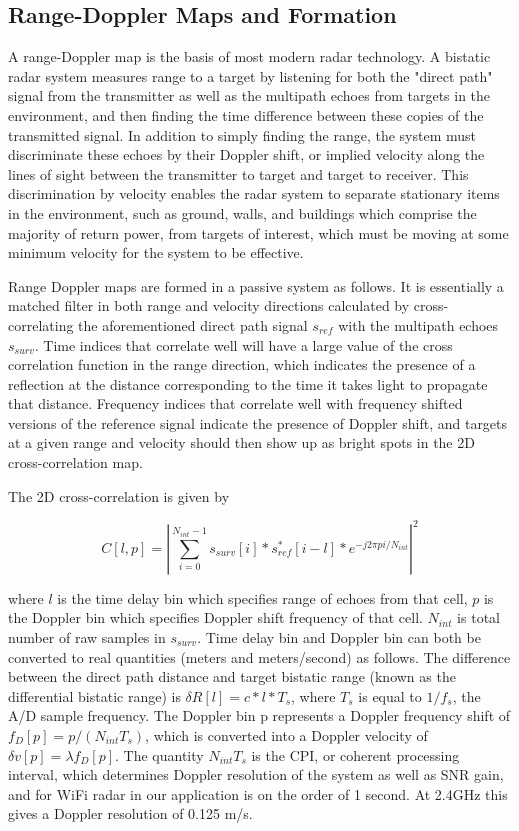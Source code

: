 \documentclass[article,11pt,onecolumn,final]{IEEEtran}
\begin{document}
\subsection{Range-Doppler Maps and Formation}

A range-Doppler map is the basis of most modern radar technology. A bistatic radar system measures range to a target by listening for both the "direct path" signal from the transmitter as well as the multipath echoes from targets in the environment, and then finding the time difference between these copies of the transmitted signal. In addition to simply finding the range, the system must discriminate these echoes by their Doppler shift, or implied velocity along the lines of sight between the transmitter to target and target to receiver. This discrimination by velocity enables the radar system to separate stationary items in the environment, such as ground, walls, and buildings which comprise the majority of return power, from targets of interest, which must be moving at some minimum velocity for the system to be effective.

Range Doppler maps are formed in a passive system as follows. It is essentially a matched filter in both range and velocity directions calculated by cross-correlating the aforementioned direct path signal $s_{ref}$ with the multipath echoes $s_{surv}$. Time indices that correlate well will have a large value of the cross correlation function in the range direction, which indicates the presence of a reflection at the distance corresponding to the time it takes light to propagate that distance. Frequency indices that correlate well with frequency shifted versions of the reference signal indicate the presence of Doppler shift, and targets at a given range and velocity should then show up as bright spots in the 2D cross-correlation map.

The 2D cross-correlation is given by

\begin{equation}
 C[l, p] = | \sum\limits_{i=0}^{N_{int}-1} s_{surv}[i]*s_{ref}^{*}[i - l]*e^{-j2\pi pi/N_{int}}|^2 
\end{equation}

where $l$ is the time delay bin which specifies range of echoes from that cell, $p$ is the Doppler bin which specifies Doppler shift frequency of that cell. $N_{int}$ is total number of raw samples in $s_{surv}$. Time delay bin and Doppler bin can both be converted to real quantities (meters and meters/second) as follows. The difference between the direct path distance and target bistatic range (known as the differential bistatic range) is $\delta R[l] = c*l*T_s$, where $T_s$ is equal to $1/f_s$, the A/D sample frequency. The Doppler bin p represents a Doppler frequency shift of $f_D[p] = p/(N_{int}T_s)$, which is converted into a Doppler velocity of $\delta v[p] = \lambda f_D[p]$. The quantity $N_{int}T_s$ is the CPI, or coherent processing interval, which determines Doppler resolution of the system as well as SNR gain, and for WiFi radar in our application is on the order of 1 second. At 2.4GHz this gives a Doppler resolution of 0.125 m/s.
\end{document}
